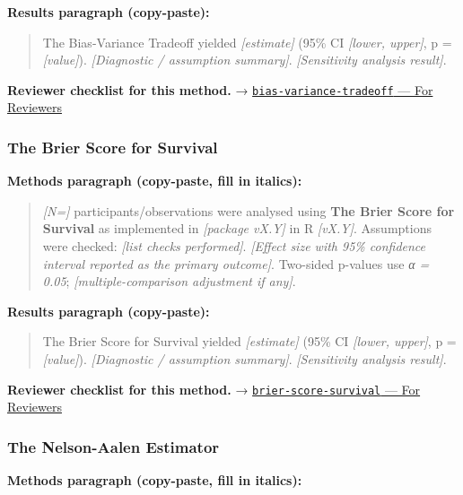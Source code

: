 \documentclass[
]{article}
\begin{document}
\textbf{Results paragraph (copy-paste):}

\begin{quote}
The Bias-Variance Tradeoff yielded \emph{{[}estimate{]}} (95\% CI
\emph{{[}lower, upper{]}}, p = \emph{{[}value{]}}). \emph{{[}Diagnostic
/ assumption summary{]}}. \emph{{[}Sensitivity analysis result{]}}.
\end{quote}

\textbf{Reviewer checklist for this method.} →
\href{../chapters/13-ml/bias-variance-tradeoff.Rmd\#for-reviewers}{\texttt{bias-variance-tradeoff}
--- For Reviewers}

\subsubsection{The Brier Score for
Survival}\label{the-brier-score-for-survival}

\textbf{Methods paragraph (copy-paste, fill in italics):}

\begin{quote}
\emph{{[}N={]}} participants/observations were analysed using
\textbf{The Brier Score for Survival} as implemented in \emph{{[}package
vX.Y{]}} in R \emph{{[}vX.Y{]}}. Assumptions were checked: \emph{{[}list
checks performed{]}}. \emph{{[}Effect size with 95\% confidence interval
reported as the primary outcome{]}}. Two-sided p-values use \emph{α =
0.05}; \emph{{[}multiple-comparison adjustment if any{]}}.
\end{quote}

\textbf{Results paragraph (copy-paste):}

\begin{quote}
The Brier Score for Survival yielded \emph{{[}estimate{]}} (95\% CI
\emph{{[}lower, upper{]}}, p = \emph{{[}value{]}}). \emph{{[}Diagnostic
/ assumption summary{]}}. \emph{{[}Sensitivity analysis result{]}}.
\end{quote}

\textbf{Reviewer checklist for this method.} →
\href{../chapters/11-survival/brier-score-survival.Rmd\#for-reviewers}{\texttt{brier-score-survival}
--- For Reviewers}

\subsubsection{The Nelson-Aalen
Estimator}\label{the-nelson-aalen-estimator}

\textbf{Methods paragraph (copy-paste, fill in italics):}
\end{document}
